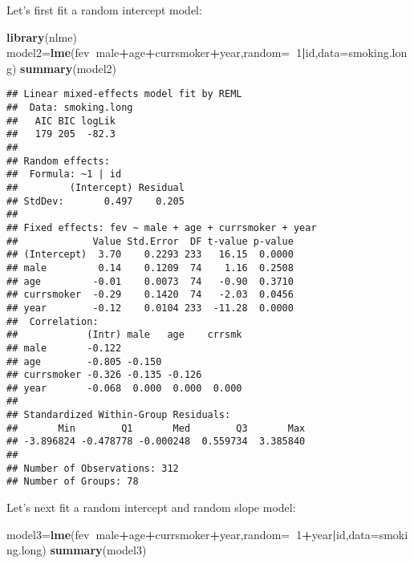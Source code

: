 \documentclass[]{book}
\newenvironment{Shaded}{\begin{snugshade}}{\end{snugshade}}
\newcommand{\KeywordTok}[1]{\textcolor[rgb]{0.13,0.29,0.53}{\textbf{#1}}}
\newcommand{\DataTypeTok}[1]{\textcolor[rgb]{0.13,0.29,0.53}{#1}}
\newcommand{\DecValTok}[1]{\textcolor[rgb]{0.00,0.00,0.81}{#1}}
\newcommand{\OperatorTok}[1]{\textcolor[rgb]{0.81,0.36,0.00}{\textbf{#1}}}
\newcommand{\NormalTok}[1]{#1}
\theoremstyle{definition}
\theoremstyle{definition}
\theoremstyle{definition}
\theoremstyle{remark}
\begin{document}
Let's first fit a random intercept model:

\begin{Shaded}
\begin{Highlighting}[]
\KeywordTok{library}\NormalTok{(nlme)}
\NormalTok{model2=}\KeywordTok{lme}\NormalTok{(fev}\OperatorTok{~}\NormalTok{male}\OperatorTok{+}\NormalTok{age}\OperatorTok{+}\NormalTok{currsmoker}\OperatorTok{+}\NormalTok{year,}\DataTypeTok{random=}\OperatorTok{~}\DecValTok{1}\OperatorTok{|}\NormalTok{id,}\DataTypeTok{data=}\NormalTok{smoking.long)}
\KeywordTok{summary}\NormalTok{(model2)}
\end{Highlighting}
\end{Shaded}

\begin{verbatim}
## Linear mixed-effects model fit by REML
##  Data: smoking.long 
##   AIC BIC logLik
##   179 205  -82.3
## 
## Random effects:
##  Formula: ~1 | id
##         (Intercept) Residual
## StdDev:       0.497    0.205
## 
## Fixed effects: fev ~ male + age + currsmoker + year 
##             Value Std.Error  DF t-value p-value
## (Intercept)  3.70    0.2293 233   16.15  0.0000
## male         0.14    0.1209  74    1.16  0.2508
## age         -0.01    0.0073  74   -0.90  0.3710
## currsmoker  -0.29    0.1420  74   -2.03  0.0456
## year        -0.12    0.0104 233  -11.28  0.0000
##  Correlation: 
##            (Intr) male   age    crrsmk
## male       -0.122                     
## age        -0.805 -0.150              
## currsmoker -0.326 -0.135 -0.126       
## year       -0.068  0.000  0.000  0.000
## 
## Standardized Within-Group Residuals:
##       Min        Q1       Med        Q3       Max 
## -3.896824 -0.478778 -0.000248  0.559734  3.385840 
## 
## Number of Observations: 312
## Number of Groups: 78
\end{verbatim}

Let's next fit a random intercept and random slope model:

\begin{Shaded}
\begin{Highlighting}[]
\NormalTok{model3=}\KeywordTok{lme}\NormalTok{(fev}\OperatorTok{~}\NormalTok{male}\OperatorTok{+}\NormalTok{age}\OperatorTok{+}\NormalTok{currsmoker}\OperatorTok{+}\NormalTok{year,}\DataTypeTok{random=}\OperatorTok{~}\DecValTok{1}\OperatorTok{+}\NormalTok{year}\OperatorTok{|}\NormalTok{id,}\DataTypeTok{data=}\NormalTok{smoking.long)}
\KeywordTok{summary}\NormalTok{(model3)}
\end{Highlighting}
\end{Shaded}
\end{document}
